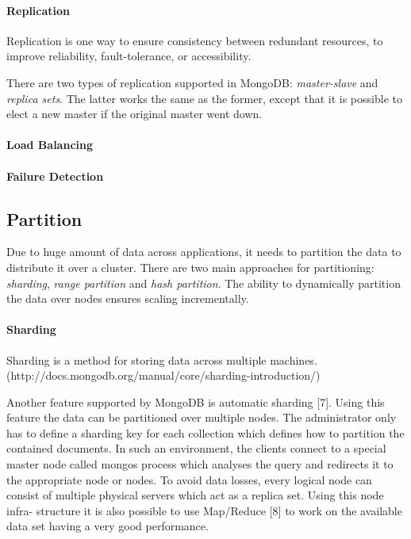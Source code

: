 \documentclass[12pt,letter]{article}
\begin{document}
\paragraph*{Replication}
Replication is one way to ensure consistency between redundant resources, to improve reliability, fault-tolerance, or accessibility. 


There are two types of replication supported in MongoDB: \textit{master-slave} and \textit{replica sets}.\citep{Suter2012} The latter works the same as the former, except that it is possible to elect a new master if the original master went down.

\paragraph*{Load Balancing} 

\paragraph*{Failure Detection}

\subsection{Partition}
Due to huge amount of data across applications, it needs to partition the data to distribute it over a cluster. There are two main approaches for partitioning: \textit{sharding}, \textit{range partition} and \textit{hash partition}. The ability to dynamically partition the data over nodes ensures scaling incrementally. 

\paragraph*{Sharding}
Sharding is a method for storing data across multiple machines. (http://docs.mongodb.org/manual/core/sharding-introduction/)

Another feature supported by MongoDB is automatic sharding [7]. Using this feature the data can be partitioned over multiple nodes. The administrator only has to define a sharding key for each collection which defines how to partition the contained documents. In such an environment, the clients connect to a special master node called mongos process which analyses the query and redirects it to the appropriate node or nodes. To avoid data losses, every logical node can consist of multiple physical servers which act as a replica set. Using this node infra- structure it is also possible to use Map/Reduce [8] to work on the available data set having a very good performance.
\end{document}
